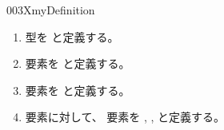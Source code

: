 \documentclass[index]{subfiles}
\begin{document}
\begin{myBlock}{003X}{myDefinition}
  \begin{enumerate}
  \item 型\myInlineMath{\myTruncLevel \myElemOf \myUniverse{\myLevelZero}}を
    \myInlineMath{\myNat \myCoproduct (\myUnitType \myCoproduct \myUnitType)}
    と定義する。
  \item 要素\myInlineMath{\myTLMinusTwo \myElemOf \myTruncLevel}を
    \myInlineMath{\myCoproductInII{\myCoproductInII{\myUnitElem}}}
    と定義する。
  \item 要素\myInlineMath{\myTLMinusOne \myElemOf \myTruncLevel}を
    \myInlineMath{\myCoproductInII{\myCoproductInI{\myUnitElem}}}
    と定義する。
  \item 要素に対して、
    要素を
    \myInlineMath{\myTLSucc{\myTLMinusTwo} \myDefEq \myTLMinusOne},
    \myInlineMath{\myTLSucc{\myTLMinusOne} \myDefEq \myCoproductInI{\myNatZero}},
    と定義する。
  \end{enumerate}
\end{myBlock}
\end{document}
